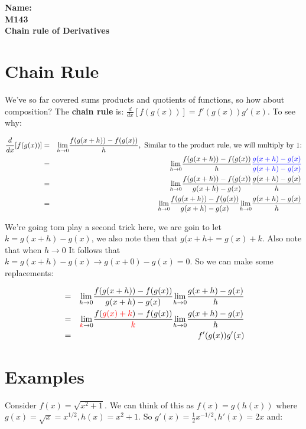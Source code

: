 \documentclass[10pt]{article}
\theoremstyle{definition}
\newcommand{\limit}[2]{\displaystyle{ \lim_{#1 \to #2}}}
\begin{document}
%

{\bf Name:} \hrulefill\hrulefill\hrulefill\\
{\bf M143} \qquad \qquad \\
{\bf Chain rule of Derivatives}\\ %

\section{Chain Rule}

We've so far covered sums products and quotients of functions, so how about composition?   The {\bf chain rule} is: $\frac{d}{dx}[f(g(x))]=f'(g(x))g'(x)$.  To see why:

\begin{eqnarray*}
\frac{d}{dx}[f(g(x))]&=&\limit{h}{0}\frac{f(g(x+h))-f(g(x))}{h},\ \text{Similar to the product rule, we will multiply by 1:}\\
&=&\limit{h}{0}\frac{f(g(x+h))-f(g(x))}{h}\textcolor{blue}{\frac{g(x+h)-g(x)}{g(x+h)-g(x)}}\\
&=&\limit{h}{0}\frac{f(g(x+h))-f(g(x))}{g(x+h)-g(x)}\frac{g(x+h)-g(x)}{h}\\
&=&\limit{h}{0}\frac{f(g(x+h))-f(g(x))}{g(x+h)-g(x)}\limit{h}{0}\frac{g(x+h)-g(x)}{h}\\
\end{eqnarray*}

We're going tom play a second trick here, we are goin to let $k=g(x+h)-g(x)$, we also note then that $g(x+h+=g(x)+k$.  Also note that when $h\to 0$  It follows that $k=g(x+h)-g(x)\to g(x+0)-g(x)=0$.  So we can make some replacements:

\begin{eqnarray*}
&=&\limit{h}{0}\frac{f(g(x+h))-f(g(x))}{g(x+h)-g(x)}\limit{h}{0}\frac{g(x+h)-g(x)}{h}\\
&=&\limit{\textcolor{red}{k}}{0}\frac{f(\textcolor{red}{g(x)+k})-f(g(x))}{\textcolor{red}{k}}\limit{h}{0}\frac{g(x+h)-g(x)}{h}\\
&=&f'(g(x))g'(x)
\end{eqnarray*}

\section{Examples}

Consider $f(x)=\sqrt{x^2+1}$.  We can think of this as $f(x)=g(h(x))$ where $g(x)=\sqrt{x}=x^{1/2}, h(x)=x^2+1$.  So $g'(x)=\frac{1}{2}x^{-1/2}, h'(x)=2x$ and:
\end{document}
